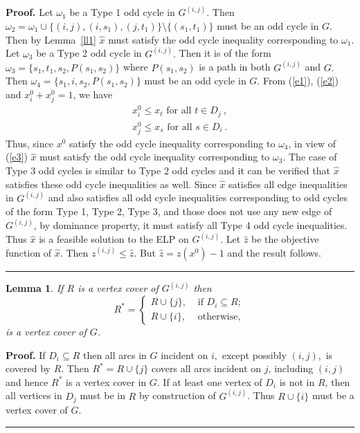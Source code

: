 \documentclass[12pt]{article}
\newtheorem{lemma}{Lemma}
\newenvironment{proof}[1][Proof]{\textbf{#1.} }{\ \rule{0.5em}{0.5em}}
\begin{document}
\begin{proof}
Let $\omega_1$ be a Type 1 odd cycle in $G^{(i,j)}$.  Then
$\omega_2=\omega_1\cup\{(i,j),(i,s_1),(j,t_1)\}\setminus\{(s_1,t_1)\}$
must be an odd cycle in $G$. Then by Lemma~\ref{ll1} $\hat{x}$ must
satisfy the odd cycle inequality corresponding to $\omega_1$. Let
$\omega_3$ be a Type 2 odd cycle in $G^{(i,j)}.$ Then it is of the
form $\omega_3=\{s_1,t_1,s_2,P(s_1,s_2)\}$ where
$P(s_1,s_2)$ is a path in both $G^{(i,j)}$ and $G.$  Then
$\omega_4=\{s_1,i,s_2, P(s_1,s_2)\}$ must be an odd cycle in $G$. From
(\ref{e1}), (\ref{e2}) and  $x^0_i+x^0_j=1$, we have
\begin{eqnarray}\label{e3}
x^0_i\leq  x_t \mbox{ for all } t\in D_j\ , \\
\label{e4} x^0_j\leq x_s \mbox{ for all } s\in
D_i\ .
\end{eqnarray}
Thus, since $x^0$ satisfy the odd cycle inequality
corresponding to $\omega_4$, in view of (\ref{e3})
$\hat{x}$ must satisfy the odd cycle inequality corresponding to
$\omega_3$. The case of Type 3 odd cycles is similar to Type 2 odd
cycles and it can be verified that $\hat{x}$ satisfies these odd
cycle inequalities as well. Since $\hat{x}$ satisfies all edge
inequalities in $G^{(i,j)}$ and also satisfies all odd cycle
inequalities corresponding to odd cycles of the form Type 1, Type 2,
Type 3, and those does not use any new edge of $G^{(i,j)}$, by
dominance property, it must satisfy all Type 4 odd cycle
inequalities. Thus  $\hat{x}$ is a feasible solution to the ELP on
$G^{(i,j)}.$ Let $ \hat{z}$ be the objective function of $\hat{x}$.
Then $z^{(i,j)}\leq \hat{z}$. But $\hat{z}=z(x^0)-1$ and the result
follows.\end{proof}

\vskip 0.7cm


\begin{lemma}If $R$ is a vertex cover of
$G^{(i,j)}$ then \begin{equation*}R^* =\begin{cases} R\cup \{j\}, & \text{ if } D_i\subseteq R;\\
R\cup \{i\}, & \text{ otherwise},\end{cases}
\end{equation*}is a vertex cover of $G$.
\end{lemma}
\begin{proof} If
$D_i\subseteq R$ then all arcs in $G$ incident on $i,$ except
possibly $(i,j),$ is covered by $R$. Then $R^*=R\cup \{j\}$ covers
all arcs incident on $j$, including $(i,j)$ and hence $R^*$ is a
vertex cover in $G$. If at least one vertex of $D_i$ is not in $R$,
then all vertices in $D_j$ must be in $R$ by construction of
$G^{(i,j)}$. Thus $R\cup\{i\}$ must be a vertex cover of $G$.
\end{proof}
\vskip 9pt
\end{document}
